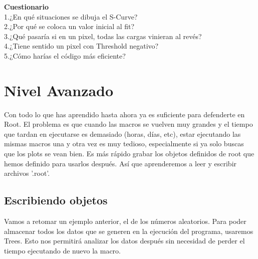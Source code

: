 \documentclass{article}
\begin{document}
\textbf{Cuestionario}\\
1.¿En qu\'e situaciones se dibuja el S-Curve?\\
2.¿Por qu\'e se coloca un valor inicial al fit?\\
3.¿Qu\'e pasar\'ia si en un pixel, todas las cargas vinieran al rev\'es?\\
4.¿Tiene sentido un pixel con Threshold negativo?\\
5.¿C\'omo har\'ias el c\'odigo m\'as eficiente?

\newpage
\section{Nivel Avanzado}

Con todo lo que has aprendido hasta ahora ya es suficiente para defenderte en Root. El problema es que cuando las macros se vuelven muy grandes y el tiempo que tardan en ejecutarse es demasiado (horas, d\'ias, etc), estar ejecutando las mismas macros una y otra vez es muy tedioso, especialmente si ya solo buscas que los plots se vean bien. Es m\'as r\'apido grabar los objetos definidos de root que hemos definido para usarlos despu\'es. As\'i que aprenderemos a leer y escribir archivos '.root'.

\subsection{Escribiendo objetos}

Vamos a retomar un ejemplo anterior, el de los n\'umeros aleatorios. Para poder almacenar todos los datos que se generen en la ejecución del programa, usaremos Trees. Esto nos permitir\'a analizar los datos despu\'es sin necesidad de perder el tiempo ejecutando de nuevo la macro.
\end{document}
